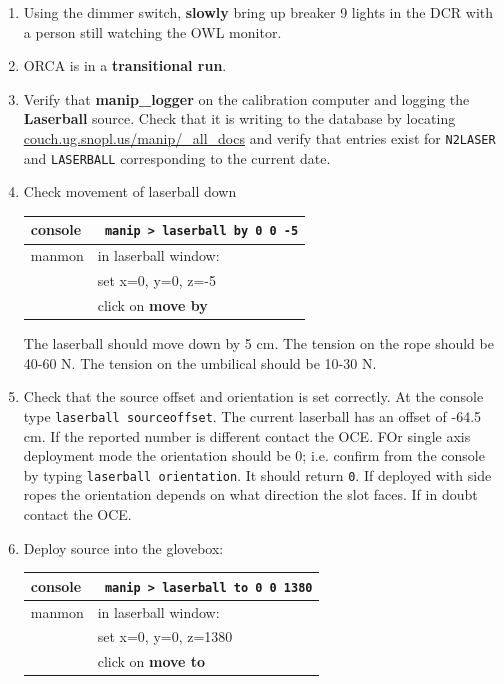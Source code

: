 \documentclass[11pt]{article}
\begin{document}
\begin{enumerate}
\item \CheckBox[name=rluo37]{} Using the dimmer switch, {\bf slowly} bring up breaker 9 lights in the DCR with a person still watching the OWL monitor.
\item \CheckBox[name=rluo39]{} ORCA is in a {\bf transitional run}.
\item \CheckBox[name=rluo40]{} Verify that {\bf manip\_logger} on the calibration computer and logging the {\bf Laserball} source. Check that it is writing to the database by locating \url{couch.ug.snopl.us/manip/_all_docs} and verify that entries exist for \verb+N2LASER+ and \verb+LASERBALL+ corresponding to the current date.
\item \CheckBox[name=rluo41]{} Check movement of laserball down
\begin{center}
\begin{tabular}{|l|l|}
\hline
console & \verb+ manip > laserball by 0 0 -5+ \\
\hline
manmon & in laserball window: \\ &  set x=0, y=0, z=-5 \\ & click on {\bf move by} \\
\hline
\end{tabular}
\end{center}
The laserball should move down by 5 cm. The tension on the rope should be 40-60 N. The tension on the umbilical should be 10-30 N.
\item \CheckBox[name=rluo42]{} Check that the source offset and orientation is set correctly. At the console type \verb+laserball sourceoffset+. The current laserball has an offset of -64.5 cm. If the reported number is different contact the OCE. FOr single axis deployment mode the orientation should be 0; i.e. confirm from the console by typing \verb+laserball orientation+. It should return \verb+0+. If deployed with side ropes the orientation depends on what direction the slot faces. If in doubt contact the OCE.
\item \CheckBox[name=rluo43]{} Deploy source into the glovebox:
\begin{center}
\begin{tabular}{|l|l|}
\hline
console & \verb+ manip > laserball to 0 0 1380+ \\
\hline
manmon & in laserball window: \\ &  set x=0, y=0, z=1380 \\ & click on {\bf move to} \\
\hline
\end{tabular}
\end{center}


\end{enumerate}
\end{document}
